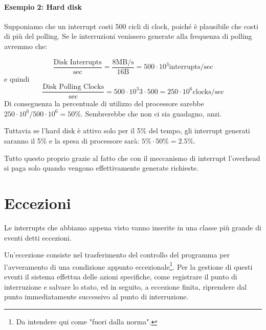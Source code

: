 \documentclass[class=book, crop=false, oneside]{standalone}
\begin{document}
\paragraph{Esempio 2: Hard disk} Supponiamo che un interrupt costi 500 cicli di clock, poiché è plausibile che costi di più del polling. Se le interruzioni venissero generate alla frequenza di polling avremmo che:

\begin{equation*}
	\frac{\textrm{Disk Interrupts}}{\textrm{sec}}=\frac{8 \textrm{MB/s}}{16\textrm{B}}=500\cdot 10^{3}\textrm{interrupts}/\textrm{sec}
\end{equation*}
e quindi
\begin{equation*}
	\frac{\textrm{Disk Polling Clocks}}{\textrm{sec}}=500\cdot 10^3{3}\cdot 500=250\cdot 10^6 \textrm{clocks}/\textrm{sec}
\end{equation*}
Di conseguenza la percentuale di utilizzo del processore sarebbe \(250\cdot 10^6/500\cdot 10^6= 50\%\). Sembrerebbe che non ci sia guadagno, anzi.

Tuttavia se l'hard disk è attivo solo per il 5\% del tempo, gli interrupt generati saranno il 5\% e la spesa di processore sarà: \(5\% \cdot 50\%=2.5\%\).

Tutto questo proprio grazie al fatto che con il meccanismo di interrupt l'overhead si paga solo quando vengono effettivamente generate richieste.

\section{Eccezioni}
Le interrupts che abbiamo appena visto vanno inserite in una classe più grande di eventi detti eccezioni.

Un'eccezione consiste nel trasferimento del controllo del programma per l'avveramento di una condizione appunto eccezionale\footnote{Da intendere qui come "fuori dalla norma".}.
Per la gestione di questi eventi il sistema effettua delle azioni specifiche, come registrare il punto di interruzione e salvare lo stato, ed in seguito, a eccezione finita, riprendere dal punto immediatamente successivo al punto di interruzione.
\end{document}

